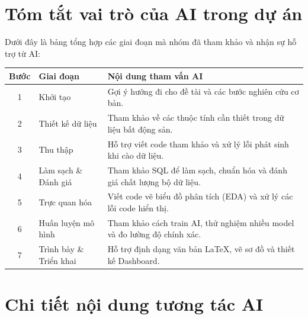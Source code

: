 \documentclass[12pt, a4paper]{article}
\begin{document}
\newpage

\section{Tóm tắt vai trò của AI trong dự án}
Dưới đây là bảng tổng hợp các giai đoạn mà nhóm đã tham khảo và nhận sự hỗ trợ từ AI:

\begin{table}[H]
\centering
\small
\renewcommand{\arraystretch}{1.4}
\begin{tabularx}{\textwidth}{|c|l|X|}
\hline
\textbf{Bước} & \textbf{Giai đoạn} & \textbf{Nội dung tham vấn AI} \\ \hline
1 & Khởi tạo & Gợi ý hướng đi cho đề tài và các bước nghiên cứu cơ bản. \\ \hline
2 & Thiết kế dữ liệu & Tham khảo về các thuộc tính cần thiết trong dữ liệu bất động sản. \\ \hline
3 & Thu thập & Hỗ trợ viết code tham khảo và xử lý lỗi phát sinh khi cào dữ liệu. \\ \hline
4 & Làm sạch \& Đánh giá & Tham khảo SQL để làm sạch, chuẩn hóa và đánh giá chất lượng bộ dữ liệu. \\ \hline
5 & Trực quan hóa & Viết code vẽ biểu đồ phân tích (EDA) và xử lý các lỗi code hiển thị. \\ \hline
6 & Huấn luyện mô hình & Tham khảo cách train AI, thử nghiệm nhiều model và đo lường độ chính xác. \\ \hline
7 & Trình bày \& Triển khai & Hỗ trợ định dạng văn bản LaTeX, vẽ sơ đồ và thiết kế Dashboard. \\ \hline
\end{tabularx}
\end{table}

\newpage

\section{Chi tiết nội dung tương tác AI}
\end{document}
